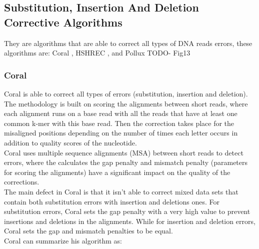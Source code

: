 \documentclass{llncs}
\begin{document}
\subsection{Substitution, Insertion And Deletion Corrective Algorithms}
They are algorithms that are able to correct all types of DNA reads errors, these algorithms are: Coral \cite{Coral}, HSHREC \cite{HShrec}, and Pollux \cite{Pollux} TODO- Fig13

\subsubsection{Coral}
Coral \cite{Coral} is able to correct all types of errors (substitution, insertion and deletion). The methodology is built on scoring the alignments between short reads, where each alignment runs on a base read with all the reads that have at least one common k-mer with this base read. Then the correction takes place for the misaligned positions depending on the number of times each letter occurs in addition to quality scores of the nucleotide.
\\
Coral uses multiple sequence alignments (MSA) between short reads to detect errors, where the calculates the gap penalty and mismatch penalty (parameters for scoring the alignments) have a significant impact on the quality of the corrections. 
\\
The main defect in Coral is that it isn't able to correct mixed data sets that contain both substitution errors with insertion and deletions ones.
For substitution errors, Coral sets the gap penalty with a very high value to prevent insertions and deletions in the alignments. While for insertion and deletion errors, Coral sets the gap and mismatch penalties to be equal.
\\
Coral can summarize his algorithm as:
\end{document}
